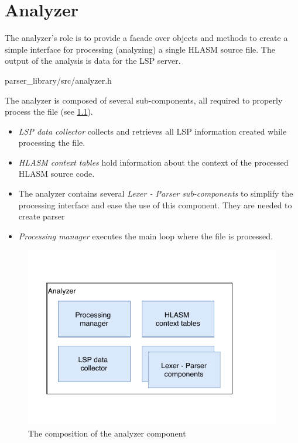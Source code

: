 \chapter {Analyzer}
\label{chap:analyzer}

The analyzer's role is to provide a facade over objects and methods to create a simple interface for processing (analyzing) a single HLASM source file. The output of the analysis is data for the LSP server.

{parser\_library/src/analyzer.h}

The analyzer is composed of several sub-components, all required to properly process the file (see \cref{fig06:analyzer}). 
\begin{itemize}
	\item \emph{LSP data collector} collects and retrieves all LSP information created while processing the file.
	\item \emph{HLASM context tables} hold information about the context of the processed HLASM source code.
	\item The analyzer contains several \emph{Lexer - Parser sub-components} to simplify the processing interface and ease the use of this component. They are needed to create parser
	\item \emph{Processing manager} executes the main loop where the file is processed.
\end{itemize}

\begin{figure}
	\centering
	\includegraphics[width=\textwidth / 2]{img/analyzer_arch}
	\caption{The composition of the analyzer component}
	\label{fig06:analyzer}
\end{figure}


